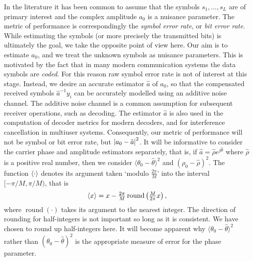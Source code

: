 \documentclass{article}
\begin{document}

In the literature it has been common to assume that the symbols $s_1, \dots, s_L$ are of primary interest and the complex amplitude $a_0$ is a nuisance parameter.  The metric of performance is correspondingly the \emph{symbol error rate}, or \emph{bit error rate}.  While estimating the symbols (or more precisely the transmitted bits) is ultimately the goal, we take the opposite point of view here.  Our aim is to estimate $a_0$, and we treat the unknown symbols as nuisance parameters.  This is motivated by the fact that in many modern communication systems the data symbols are \emph{coded}.  For this reason raw symbol error rate is not of interest at this stage.  Instead, we desire an accurate estimator $\hat{a}$ of $a_0$, so that the compensated received symbols $\hat{a}^{-1}y_i$ can be accurately modelled using an additive noise channel.  The additive noise channel is a common assumption for subsequent receiver operations, such as decoding.  The estimator $\hat{a}$ is also used in the computation of decoder metrics for modern decoders, and for interference cancellation in multiuser systems.  Consequently, our metric of performance will not be symbol or bit error rate, but ${\left\vert a_0 - \hat{a} \right\vert}^2$. It will be informative to consider the carrier phase and amplitude estimators separately, that is, if $\hat{a} = \hat{\rho}e^{j\hat{\theta}}$ where $\hat{\rho}$ is a positive real number, then we consider $\langle\theta_0 - \hat{\theta}\rangle^2$ and $(\rho_0 - \hat{\rho})^2$.  The function $\left\langle \cdot \right\rangle$ denotes its argument taken `modulo $\tfrac{2\pi}{M}$' into the interval $[-\pi/M, \pi/M)$, that is
\[
\left\langle x \right\rangle = x - \tfrac{2\pi}{M}\operatorname{round}\left(\tfrac{M}{2\pi}x\right),
\]  
where $\operatorname{round}(\cdot)$ takes its argument to the nearest integer.  The direction of rounding for half-integers is not important so long as it is consistent.  We have chosen to round up half-integers here.  It will become apparent why $\langle\theta_0 - \hat{\theta}\rangle^2$ rather than $(\theta_0 - \hat{\theta})^2$ is the appropriate measure of error for the phase parameter.
\end{document}

